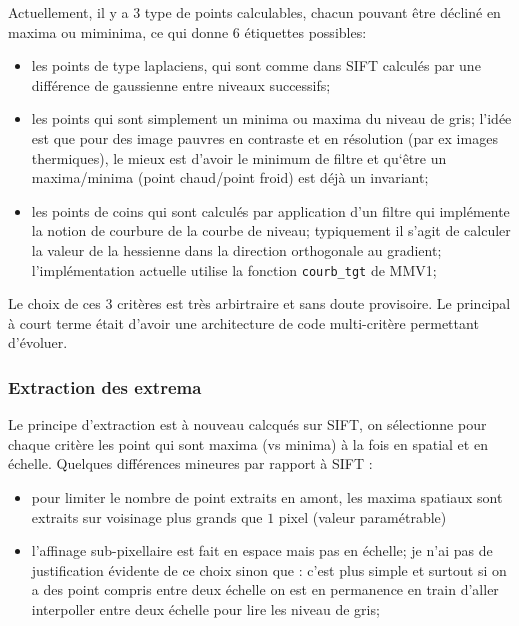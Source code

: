 Actuellement, il y a $3$ type de points calculables, chacun pouvant être d\'eclin\'e en maxima
ou miminima, ce qui donne $6$ \'etiquettes possibles:

\begin{itemize}
   \item les points de type laplaciens, qui sont comme dans SIFT calcul\'es par  une diff\'erence de
         gaussienne entre niveaux successifs;

   \item les points qui sont simplement un minima ou maxima du niveau de gris; l'id\'ee est que pour des
         image pauvres en contraste et en r\'esolution (par ex images thermiques), le mieux est d'avoir le
         minimum de filtre et qu`\^etre un maxima/minima (point chaud/point froid) est d\'ej\`a un invariant;


   \item les points de coins qui sont calcul\'es par application d'un filtre qui impl\'emente
          la notion de courbure de la courbe de niveau; typiquement il s'agit de calculer la valeur
          de la hessienne dans la direction orthogonale au gradient; l'impl\'ementation actuelle
          utilise la fonction {\tt courb\_tgt} de MMV1;
\end{itemize}


Le choix de ces $3$ crit\`eres est tr\`es arbirtraire et sans doute provisoire. Le principal 
\`a court terme \'etait d'avoir une architecture de code multi-crit\`ere permettant d'\'evoluer.



\subsubsection{Extraction des extrema}

Le principe d'extraction est \`a nouveau calcqu\'es sur SIFT, on s\'electionne pour chaque
crit\`ere les point qui sont maxima (vs minima) \`a la fois en spatial et en \'echelle.
Quelques diff\'erences mineures par rapport \`a SIFT :

\begin{itemize}
  \item pour limiter le nombre de point extraits en amont, les maxima spatiaux sont 
        extraits sur voisinage plus grands que $1$ pixel (valeur param\'etrable)

  \item l'affinage sub-pixellaire est fait en espace mais pas en \'echelle;  je n'ai pas
        de justification \'evidente de ce choix sinon que : c'est plus simple et surtout 
        si on a des point compris entre deux \'echelle on est en permanence en train d'aller
        interpoller entre deux \'echelle pour lire les niveau de gris;

\end{itemize}


